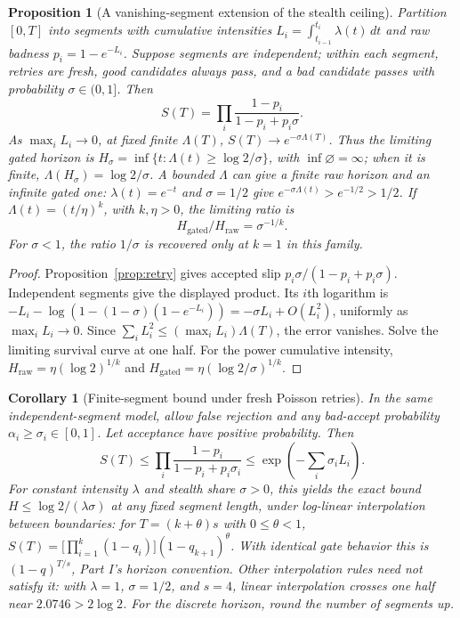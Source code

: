 \documentclass[11pt]{article}
\newtheorem{proposition}[theorem]{Proposition}
\newtheorem{corollary}[theorem]{Corollary}
\theoremstyle{definition}
\theoremstyle{remark}
\begin{document}
\begin{proposition}[A vanishing-segment extension of the stealth ceiling]\label{prop:hazard}
Partition $[0,T]$ into segments with cumulative intensities
$L_i=\int_{t_{i-1}}^{t_i}\lambda(t)\,dt$ and raw badness $p_i=1-e^{-L_i}$.
Suppose segments are independent; within each segment, retries are fresh, good candidates
always pass, and a bad candidate passes with probability $\sigma\in(0,1]$.
Then
\begin{equation}\label{eq:finitehazard}
S(T)=\prod_i\frac{1-p_i}{1-p_i+p_i\sigma}.
\end{equation}
As $\max_i L_i\to0$, at fixed finite $\Lambda(T)$,
$S(T)\to e^{-\sigma\Lambda(T)}$. Thus the limiting gated horizon is
$H_\sigma=\inf\{t:\Lambda(t)\ge\log2/\sigma\}$, with $\inf\varnothing=\infty$; when it is finite,
$\Lambda(H_\sigma)=\log2/\sigma$. A bounded $\Lambda$ can give a finite raw horizon and an infinite
gated one: $\lambda(t)=e^{-t}$ and $\sigma=1/2$ give $e^{-\sigma\Lambda(t)}>e^{-1/2}>1/2$. If $\Lambda(t)=(t/\eta)^k$, with $k,\eta>0$, the limiting ratio is
\begin{equation}\label{eq:weibull}
H_{\mathrm{gated}}/H_{\mathrm{raw}}=\sigma^{-1/k}.
\end{equation}
For $\sigma<1$, the ratio $1/\sigma$ is recovered only at $k=1$ in this family.
\end{proposition}
\begin{proof}
Proposition~\ref{prop:retry} gives accepted slip
$p_i\sigma/(1-p_i+p_i\sigma)$. Independent segments give the displayed product.
Its $i$th logarithm is $-L_i-\log(1-(1-\sigma)(1-e^{-L_i}))
=-\sigma L_i+O(L_i^2)$, uniformly as $\max_iL_i\to0$.
Since $\sum_i L_i^2\le(\max_iL_i)\Lambda(T)$, the error vanishes.
Solve the limiting survival curve at one half. For the power cumulative intensity,
$H_{\mathrm{raw}}=\eta(\log2)^{1/k}$ and
$H_{\mathrm{gated}}=\eta(\log2/\sigma)^{1/k}$.
\end{proof}
\begin{corollary}[Finite-segment bound under fresh Poisson retries]\label{cor:finitefloor}
In the same independent-segment model, allow false rejection and any bad-accept probability
$\alpha_i\ge\sigma_i\in[0,1]$. Let acceptance have positive probability. Then
\[
S(T)\le\prod_i\frac{1-p_i}{1-p_i+p_i\sigma_i}
\le\exp\left(-\sum_i\sigma_i L_i\right).
\]
For constant intensity $\lambda$ and stealth share $\sigma>0$, this yields the exact bound
$H\le\log2/(\lambda\sigma)$ at any fixed segment length, under log-linear interpolation between
boundaries: for $T=(k+\theta)s$ with $0\le\theta<1$,
$S(T)=\big[\prod_{i=1}^{k}(1-q_i)\big](1-q_{k+1})^\theta$. With identical gate behavior this is
$(1-q)^{T/s}$, Part I's horizon convention. Other interpolation rules
need not satisfy it: with $\lambda=1$, $\sigma=1/2$, and $s=4$, linear interpolation crosses one
half near $2.0746>2\log2$.
For the discrete horizon, round the number of segments up.
\end{corollary}
\end{document}

